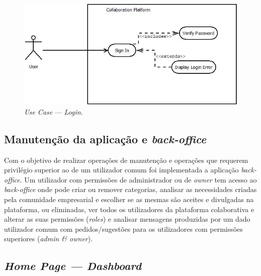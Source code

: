 \begin{figure}[H]
    \centering
    \includegraphics[scale=0.6]{figures/Login Use Case.jpeg}
    \caption{\textit{Use Case} --- \textit{Login}.}\label{fig:uc:login}
\end{figure}

\subsection{Manutenção da aplicação e \textit{back-office}}\label{subsec:manutencao_e_back-office}

Com o objetivo de realizar operações de manutenção e operações que requerem privilégio superior ao de um utilizador comum foi implementada a aplicação \textit{back-office}. 
Um utilizador com permissões de administrador ou de \textit{owner} tem acesso ao \textit{back-office} onde pode criar ou remover categorias, analisar as necessidades criadas pela comunidade empresarial e escolher se as mesmas são aceites e divulgadas na plataforma, ou eliminadas,
ver todos os utilizadores da plataforma colaborativa e alterar as suas permissões (\textit{roles}) e analisar mensagens produzidas por um dado utilizador comum com pedidos/sugestões para os utilizadores com permissões superiores (\textit{admin & owner}).  


\subsection{\textit{Home Page --- Dashboard}}\label{subsec:dashboard}

